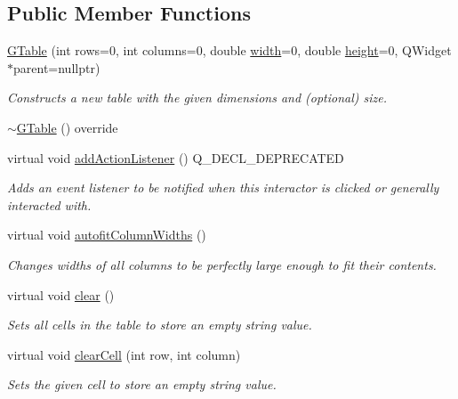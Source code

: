 \subsection*{Public Member Functions}
\begin{DoxyCompactItemize}
\item 
\mbox{\hyperlink{classsgl_1_1GTable_a5ceea9546881f429ad4601366908848d}{G\+Table}} (int rows=0, int columns=0, double \mbox{\hyperlink{classsgl_1_1GTable_ad72663daf610f2a0833a2fc3d78e4fdf}{width}}=0, double \mbox{\hyperlink{classsgl_1_1GTable_ad3774f6419003470f54fd495124ef51f}{height}}=0, Q\+Widget $\ast$parent=nullptr)
\begin{DoxyCompactList}\small\item\em Constructs a new table with the given dimensions and (optional) size. \end{DoxyCompactList}\item 
\mbox{\hyperlink{classsgl_1_1GTable_aa9d949edf98f5e891678aca78500550b}{$\sim$\+G\+Table}} () override
\item 
virtual void \mbox{\hyperlink{classsgl_1_1GInteractor_a02f20ea6edfa0671f31c4c648a253833}{add\+Action\+Listener}} () Q\+\_\+\+D\+E\+C\+L\+\_\+\+D\+E\+P\+R\+E\+C\+A\+T\+ED
\begin{DoxyCompactList}\small\item\em Adds an event listener to be notified when this interactor is clicked or generally interacted with. \end{DoxyCompactList}\item 
virtual void \mbox{\hyperlink{classsgl_1_1GTable_afaf36ccb6a75432b5f5463613ef01ef4}{autofit\+Column\+Widths}} ()
\begin{DoxyCompactList}\small\item\em Changes widths of all columns to be perfectly large enough to fit their contents. \end{DoxyCompactList}\item 
virtual void \mbox{\hyperlink{classsgl_1_1GTable_ac8bb3912a3ce86b15842e79d0b421204}{clear}} ()
\begin{DoxyCompactList}\small\item\em Sets all cells in the table to store an empty string value. \end{DoxyCompactList}\item 
virtual void \mbox{\hyperlink{classsgl_1_1GTable_ab7bffbf52806e438ac155886079d9bf6}{clear\+Cell}} (int row, int column)
\begin{DoxyCompactList}\small\item\em Sets the given cell to store an empty string value. \end{DoxyCompactList}\item 

\end{DoxyCompactItemize}
